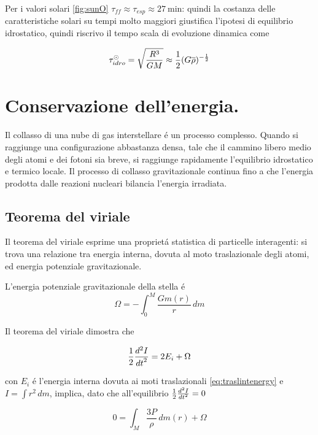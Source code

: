 \documentclass[../main.tex]{subfiles}
\begin{document}
Per i valori solari \ref{fig:sunO} $\tau_{ff}\approx\tau_{esp}\approx\SI{27}{\minute}$: quindi la costanza delle caratteristiche solari su tempi molto maggiori giustifica l'ipotesi di equilibrio idrostatico, quindi  riscrivo il tempo scala di evoluzione dinamica come

\begin{equation}
\tau_{idro}^{\odot}= \sqrt{\frac{R^3}{GM}}\approx\frac{1}{2}(G\overline{\rho})\expy{-\frac{1}{2}}
\end{equation}


\section{Conservazione dell'energia.}

Il collasso di una nube di gas interstellare \'e un processo complesso. Quando si raggiunge una configurazione abbastanza densa, tale che il cammino libero medio degli atomi e dei fotoni sia breve, si raggiunge rapidamente l'equilibrio idrostatico e termico locale. Il processo di collasso gravitazionale continua fino a che l'energia prodotta dalle reazioni nucleari bilancia l'energia irradiata.

\subsection{Teorema del viriale}

Il teorema del viriale esprime una propriet\'a statistica di particelle interagenti: si trova una relazione tra energia interna, dovuta al moto traslazionale degli atomi, ed energia potenziale gravitazionale.

L'energia potenziale gravitazionale della stella \'e
\begin{equation}
\Omega=-\int_0^M\frac{Gm(r)}{r}\,dm\label{eq:energiapg}
\end{equation}

Il teorema del viriale dimostra che

\begin{equation}
\frac{1}{2}\TtwoDy{t}{I}=2E_i+\Omega
\end{equation}

con $E_i$ \'e l'energia interna dovuta ai moti traslazionali \eqref{eq:traslintenergy} e $I=\int r^2\,dm$, implica, dato che all'equilibrio $\frac{1}{2}\TtwoDy{t}{I}=0$

\begin{equation}
0=\int_M\frac{3P}{\rho}\,dm(r)+\Omega
\end{equation}
\end{document}
